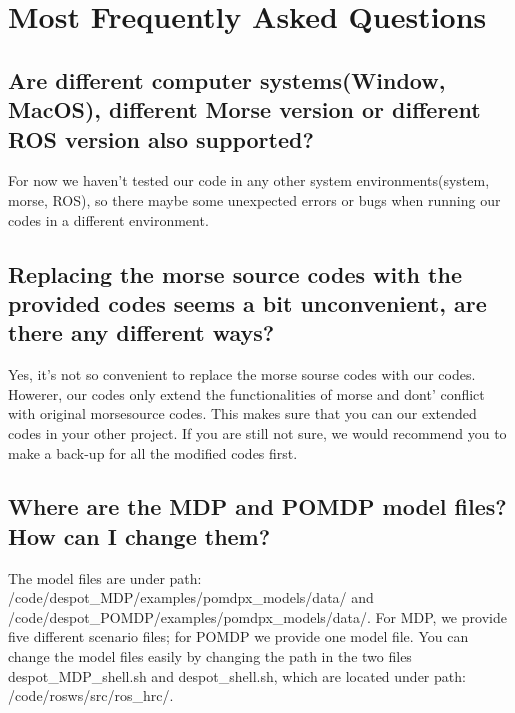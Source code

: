 \chapter{Most Frequently Asked Questions}

\section{Are different computer systems(Window, MacOS), different Morse version or different ROS version also supported?}
For now we haven't tested our code in any other system environments(system, morse, ROS), so there maybe some unexpected errors or bugs when running our codes in a different environment.

\section{Replacing the morse source codes with the provided codes seems a bit unconvenient, are there any different ways?}
Yes, it's not so convenient to replace the morse sourse codes with our codes. Howerer, our codes only extend the functionalities of morse and dont' conflict with original morsesource codes. This makes sure that you can our extended codes in your other project. If you are still not sure, we would recommend you to make a back-up for all the modified codes first.

\section{Where are the MDP and POMDP model files? How can I change them?}
The model files are under path: /code/despot\_MDP/examples/pomdpx\_models/data/ and /code/despot\_POMDP/examples/pomdpx\_models/data/. For MDP, we provide five different scenario files; for POMDP we provide one model file. You can change the model files easily by changing the path in the two files despot\_MDP\_shell.sh and despot\_shell.sh, which are located under path: /code/ros\-ws/src/ros\_hrc/.